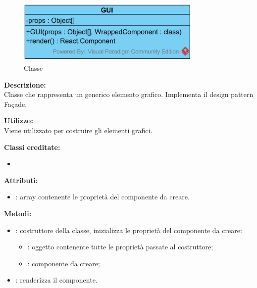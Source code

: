 \paragraph[::GUI]{\class}\mbox{}\\ \label{\class}
\begin{figure}[H]
	\centering
	\includegraphics[width=9cm]{./diagrammi/framework/view/gui/gui.png}
	\caption{Classe \class}
\end{figure}
\textbf{Descrizione:}\\
Classe che rappresenta un generico elemento grafico. Implementa il design pattern Fa\c{c}ade.

\textbf{Utilizzo:}\\
Viene utilizzato per costruire gli elementi grafici.

\textbf{Classi ereditate:}
\begin{itemize}
	\item {}
\end{itemize}


\textbf{Attributi:}
\begin{itemize}
	\item {}: array contenente le proprietà del componente da creare.
\end{itemize}

\textbf{Metodi:}
\begin{itemize}
	\item {}: costruttore della classe, inizializza le proprietà del componente da creare:
	\begin{itemize}
		\item {}: oggetto contenente tutte le proprietà passate al costruttore;
		\item {}: componente da creare;
	\end{itemize}
	\item {}: renderizza il componente.
\end{itemize}

